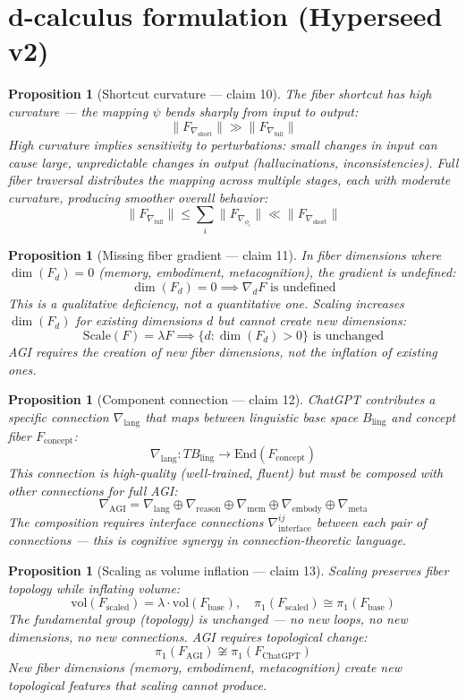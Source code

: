 \documentclass[11pt,a4paper]{article}
\newtheorem{proposition}[definition]{Proposition}
\begin{document}
\section{d-calculus formulation (Hyperseed v2)}

\begin{proposition}[Shortcut curvature --- claim 10]
\label{prop:curvature}
The fiber shortcut has high curvature --- the mapping $\psi$ bends
sharply from input to output:
\[
  \|F_{\nabla_{\text{short}}}\| \gg \|F_{\nabla_{\text{full}}}\|
\]
High curvature implies sensitivity to perturbations: small changes in
input can cause large, unpredictable changes in output (hallucinations,
inconsistencies). Full fiber traversal distributes the mapping across
multiple stages, each with moderate curvature, producing smoother
overall behavior:
\[
  \|F_{\nabla_{\text{full}}}\| \leq \sum_i \|F_{\nabla_{\phi_i}}\|
  \ll \|F_{\nabla_{\text{short}}}\|
\]
\end{proposition}

\begin{proposition}[Missing fiber gradient --- claim 11]
\label{prop:gradient}
In fiber dimensions where $\dim(F_d) = 0$ (memory, embodiment,
metacognition), the gradient is undefined:
\[
  \dim(F_d) = 0 \implies \nabla_d F \text{ is undefined}
\]
This is a \emph{qualitative} deficiency, not a quantitative one. Scaling
increases $\dim(F_d)$ for existing dimensions $d$ but cannot create new
dimensions:
\[
  \text{Scale}(F) = \lambda F \implies \{d : \dim(F_d) > 0\}
  \text{ is unchanged}
\]
AGI requires the creation of new fiber dimensions, not the inflation of
existing ones.
\end{proposition}

\begin{proposition}[Component connection --- claim 12]
\label{prop:component}
ChatGPT contributes a specific connection $\nabla_{\text{lang}}$ that
maps between linguistic base space $B_{\text{ling}}$ and concept fiber
$F_{\text{concept}}$:
\[
  \nabla_{\text{lang}}: TB_{\text{ling}} \to \text{End}(F_{\text{concept}})
\]
This connection is high-quality (well-trained, fluent) but must be
composed with other connections for full AGI:
\[
  \nabla_{\text{AGI}} = \nabla_{\text{lang}} \oplus \nabla_{\text{reason}}
    \oplus \nabla_{\text{mem}} \oplus \nabla_{\text{embody}}
    \oplus \nabla_{\text{meta}}
\]
The composition requires interface connections $\nabla_{\text{interface}}^{ij}$
between each pair of connections --- this is cognitive synergy in
connection-theoretic language.
\end{proposition}

\begin{proposition}[Scaling as volume inflation --- claim 13]
\label{prop:volume}
Scaling preserves fiber topology while inflating volume:
\[
  \text{vol}(F_{\text{scaled}}) = \lambda \cdot \text{vol}(F_{\text{base}}),
  \quad \pi_1(F_{\text{scaled}}) \cong \pi_1(F_{\text{base}})
\]
The fundamental group (topology) is unchanged --- no new loops, no new
dimensions, no new connections. AGI requires topological change:
\[
  \pi_1(F_{\text{AGI}}) \not\cong \pi_1(F_{\text{ChatGPT}})
\]
New fiber dimensions (memory, embodiment, metacognition) create new
topological features that scaling cannot produce.
\end{proposition}
\end{document}

